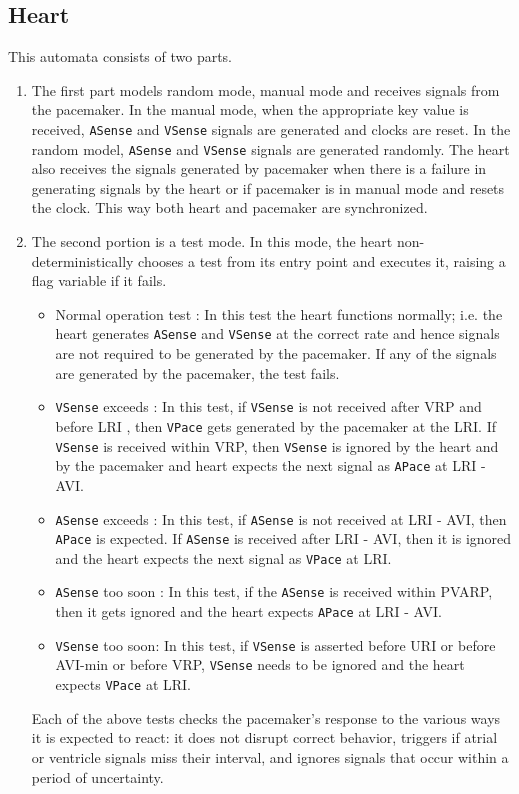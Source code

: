 \documentclass[a4paper]{article}
\begin{document}
\subsection{Heart} This automata consists of two parts. 
\begin{enumerate}
\item The first part models random mode, manual mode and receives signals from the pacemaker. In the manual mode, when the appropriate key value is received, {\tt ASense} and {\tt VSense} signals are generated and clocks are reset. In the random model, {\tt ASense} and {\tt VSense} signals are generated randomly. The heart also receives the signals generated by pacemaker when there is a failure in generating signals by the heart or if pacemaker is in manual mode and resets the clock. This way both heart and pacemaker are synchronized.
\item The second portion is a test mode.  In this mode, the heart non-deterministically chooses a test from its entry point and executes it, raising a flag variable if it fails.
\begin{itemize}
\item Normal operation test : In this test the heart functions normally; i.e. the heart generates {\tt ASense} and {\tt VSense} at the correct rate and hence signals are not required to be generated by the pacemaker.  If any of the signals are generated by the pacemaker, the test fails.
\item {\tt VSense} exceeds : In this test, if {\tt VSense} is not received after VRP and before LRI , then {\tt VPace} gets generated by the pacemaker at the LRI. If {\tt VSense} is received within VRP, then {\tt VSense} is ignored by the heart and by the pacemaker and heart expects the next signal as {\tt APace} at LRI - AVI. 
\item {\tt ASense} exceeds :  In this test, if {\tt ASense} is not received at LRI - AVI, then {\tt APace} is expected. If {\tt ASense} is received after LRI - AVI, then it is ignored and the heart expects the next signal as {\tt VPace} at LRI.
\item {\tt ASense} too soon : In this test, if the {\tt ASense} is received within PVARP, then it gets ignored and the heart expects {\tt APace} at LRI - AVI. 
\item {\tt VSense} too soon: In this test, if {\tt VSense} is asserted before URI or before AVI-min or before VRP, {\tt VSense} needs to be ignored and the heart expects {\tt VPace} at LRI.
\end{itemize}
Each of the above tests checks the pacemaker's response to the various ways it is expected to react: it does not disrupt correct behavior, triggers if atrial or ventricle signals miss their interval, and ignores signals that occur within a period of uncertainty.
\end{enumerate}
\end{document}
